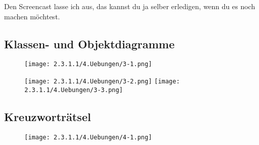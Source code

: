 \documentclass[]{scrartcl}   %
\begin{document}
Den Screencast lasse ich aus, das kannst du ja selber erledigen, wenn du es noch machen möchtest.

\newpage

\subsection{Klassen- und Objektdiagramme}

\begin{figure}[ht]
    \centering
	\texttt{[image: 2.3.1.1/4.Uebungen/3-1.png]}
\end{figure}

\vspace{0.5cm}

\begin{figure}[ht]
	\centering
	\texttt{[image: 2.3.1.1/4.Uebungen/3-2.png]}
	\hspace{0.5cm}
	\texttt{[image: 2.3.1.1/4.Uebungen/3-3.png]}
\end{figure}

\newpage

\subsection{Kreuzworträtsel}

\begin{figure}[ht]
    \centering
	\texttt{[image: 2.3.1.1/4.Uebungen/4-1.png]}
\end{figure}
\end{document}
